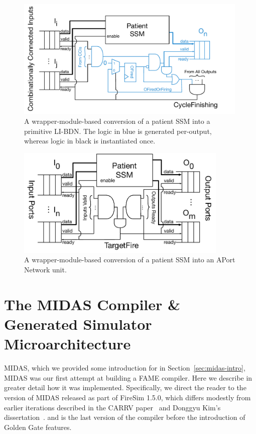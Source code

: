 \begin{figure}
    \centering
    \includegraphics[width=0.99\textwidth]{figures/libdn-wrapper.pdf}
    \caption{A wrapper-module-based conversion of a patient SSM into a primitive LI-BDN. The logic in blue
    is generated per-output, whereas logic in black is instantiated once.}
    \label{fig:libdn-wrapper}
\end{figure}

\begin{figure}
    \centering
    \includegraphics[width=0.9\textwidth]{figures/aport-network-wrapper.pdf}
    \caption{A wrapper-module-based conversion of a patient SSM into an APort Network unit.}
    \label{fig:aport-network-wrapper}
\end{figure}

\section{The MIDAS Compiler \& Generated Simulator Microarchitecture} MIDAS,
which we provided some introduction for in Section~\ref{sec:midas-intro}, MIDAS
was our first attempt at building a FAME compiler. Here we describe in greater
detail how it was implemented. Specifically, we direct the reader to the
version of MIDAS released as part of FireSim 1.5.0, which differs modestly from
earlier iterations described in the CARRV paper~\cite{MIDAS} and Donggyu Kim's
dissertation~\cite{DGKDissertation}. and is the last version of the compiler
before the introduction of Golden Gate features.

